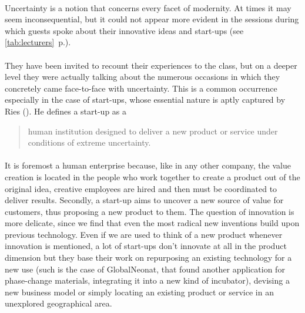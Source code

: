 \documentclass[twoside]{report}
\begin{document}
\paragraph{}
Uncertainty is a notion that concerns every facet of modernity. At times it may seem inconsequential, but it could not appear more evident in the sessions during which guests spoke about their innovative ideas and start-ups (see \ref{tab:lecturers}~p.\pageref{tab:lecturers}). 
\paragraph{}
They have been invited to recount their experiences to the class, but on a deeper level they were actually talking about the numerous occasions in which they concretely came face-to-face with uncertainty. This is a common occurrence especially in the case of start-ups, whose essential nature is aptly captured by Ries (\cite{ries_what_2010}). He defines a start-up as a \begin{quote}human institution designed to deliver a new product or service under conditions of extreme uncertainty.\end{quote}
\paragraph{}
It is foremost a human enterprise because, like in any other company, the value creation is located in the people who work together to create a product out of the original idea, creative employees are hired and then must be coordinated to deliver results.  Secondly, a start-up aims to uncover a new source of value for customers, thus proposing a new product to them. The question of innovation is more delicate, since we find that even the most radical new inventions build upon previous technology. Even if we are used to think of a new product whenever innovation is mentioned, a lot of start-ups don't innovate at all in the product dimension but they base their work on repurposing an existing technology for a new use (such is the case of GlobalNeonat, that found another application for phase-change materials, integrating it into a new kind of incubator), devising a new business model or simply locating an existing product or service in an unexplored geographical area. 
\end{document}
